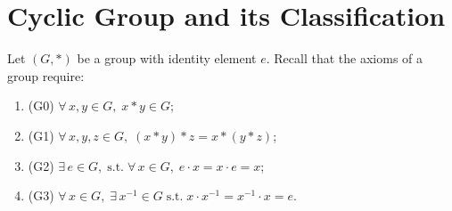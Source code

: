 \documentclass[11pt,openany]{article}
\begin{document}
\section*{Cyclic Group and its Classification}
\begin{note}
Let \( (G, \ast) \) be a group with identity element \( e \). Recall that the axioms of a group require:
\begin{enumerate}[(G1)]
	\item[] (G0)\; $\forall\, x, y \in G,\;  x \ast y\in G$;
	\item[] (G1)\; $\forall\, x, y, z \in G,\;  (x \ast y) \ast z = x \ast (y\ast z)$;
	\item[] (G2)\; $\exists\, e \in G,\; \text{s.t.}\; \forall\, x \in G,\; e \cdot x = x \cdot e = x$;
	\item[] (G3)\; $\forall\, x \in G,\; \exists\, x^{-1} \in G\; \text{s.t.}\; x \cdot x^{-1} = x^{-1} \cdot x = e$.
\end{enumerate}
\end{note}
\end{document}
